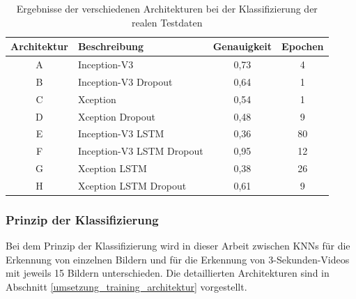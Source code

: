 \begin{table}[h]
\small
\centering
\def\arraystretch{1.4}
\begin{tabular}{c p{3cm} c c}
\textbf{Architektur} & \textbf{Beschreibung} & \textbf{Genauigkeit} & \textbf{Epochen} \\
\hline
A & Inception-V3 & 0,73 & 4 \\
\hline
B & Inception-V3 \newline Dropout & 0,64 & 1 \\
\hline
C & Xception & 0,54 & 1 \\
\hline
D & Xception \newline Dropout & 0,48 & 9 \\
\hline 
E & Inception-V3 \newline LSTM & 0,36 & 80 \\
\hline
F & Inception-V3 \newline LSTM \newline Dropout & 0,95 & 12 \\
\hline
G & Xception \newline LSTM & 0,38 & 26 \\
\hline
H & Xception \newline LSTM \newline Dropout & 0,61 & 9 \\
\hline
\end{tabular}
\caption{Ergebnisse der verschiedenen Architekturen bei der Klassifizierung der realen Testdaten}
\label{tab_ergebnis_real}
\end{table}

\subsubsection{Prinzip der Klassifizierung}

Bei dem Prinzip der Klassifizierung wird in dieser Arbeit zwischen \acp{KNN} für die Erkennung von einzelnen Bildern und für die Erkennung von 3-Sekunden-Videos mit jeweils 15 Bildern unterschieden. Die detaillierten Architekturen sind in Abschnitt \ref{umsetzung_training_architektur} vorgestellt.

